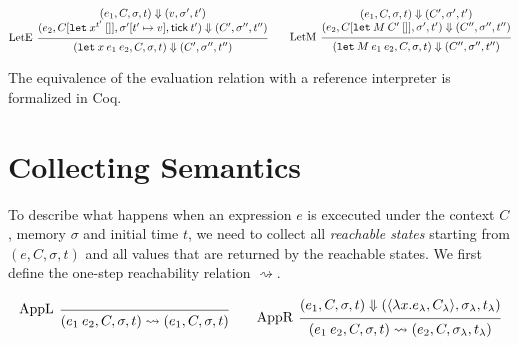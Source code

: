 \documentclass{article}
\theoremstyle{definition}
\newcommand*{\tick}{\mathsf{tick}}
\begin{document}
\[
  \begin{prooftree}
    \hypo{
      \begin{matrix}
        (e_{1}, C, \sigma, t)
        \Downarrow
        (v, \sigma', t') \\
        (e_{2}, C[\mathtt{let}\:x^{t'}\:[]], \sigma'[t'\mapsto v], \tick\:t')
        \Downarrow
        (C', \sigma'', t'')
      \end{matrix}
    }
    \infer[left label=LetE]1{
    (\mathtt{let}\:x\:e_1\:e_2, C, \sigma, t)
    \Downarrow
    (C', \sigma'', t'')
    }
  \end{prooftree}\qquad
  \begin{prooftree}
    \hypo{
      \begin{matrix}
        (e_{1}, C, \sigma, t)
        \Downarrow
        (C', \sigma', t') \\
        (e_{2}, C[\mathtt{let}\:M\:C'\:[]], \sigma', t')
        \Downarrow
        (C'', \sigma'', t'')
      \end{matrix}
    }
    \infer[left label=LetM]1{
    (\mathtt{let}\:M\:e_{1}\:e_{2}, C, \sigma, t)
    \Downarrow
    (C'', \sigma'', t'')
    }
  \end{prooftree}
\]

The equivalence of the evaluation relation with a reference interpreter is formalized in Coq.

\section{Collecting Semantics}

To describe what happens when an expression $e$ is excecuted under the context $C$, memory $\sigma$ and initial time $t$, we need to collect all \emph{reachable states} starting from $(e,C,\sigma,t)$ and all values that are returned by the reachable states.
We first define the one-step reachability relation $\rightsquigarrow$.

\[
  \begin{prooftree}
    \infer[left label={AppL}]0{
    (e_{1}\:e_{2}, C, \sigma, t)
    \rightsquigarrow
    (e_{1},C, \sigma,t)
    }
  \end{prooftree}\qquad
  \begin{prooftree}
    \hypo{
      \begin{matrix}
        (e_{1}, C, \sigma, t)
        \Downarrow
        (\langle\lambda x.e_{\lambda}, C_{\lambda}\rangle, \sigma_{\lambda}, t_{\lambda})
      \end{matrix}
    }
    \infer[left label={AppR}]1{
    (e_{1}\:e_{2}, C, \sigma, t)
    \rightsquigarrow
    (e_{2}, C, \sigma_{\lambda}, t_{\lambda})
    }
  \end{prooftree}
\]
\end{document}
